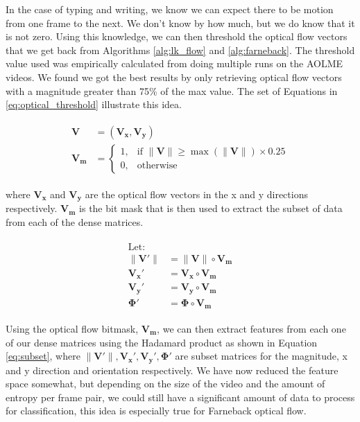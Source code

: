 In the case of typing and writing, we know we can expect there to be motion from
one frame to the next. We don't know by how much, but we do know that it is not
zero. Using this knowledge, we can then threshold the optical flow vectors that
we get back from Algorithms \ref{alg:lk_flow} and \ref{alg:farneback}. The
threshold value used was empirically calculated from doing multiple runs on the
AOLME videos. We found we got the best results by only retrieving
optical flow vectors with a magnitude greater than 75\% of the max value. The set
of Equations in \ref{eq:optical_threshold} illustrate this idea.

\begin{align}
  \label{eq:optical_threshold}
  \begin{split}
  \mathbf{V} &= (\mathbf{V_x}, \mathbf{V_y}) \\
  \mathbf{V_m} &=
  \begin{cases}
    1, & \text{if } \|\mathbf{V}\| \geq \max( \|\mathbf{V}\|) \times 0.25 \\
    0, & \text{otherwise}
  \end{cases}
  \end{split}
\end{align}

where $\mathbf{V_x}$ and $\mathbf{V_y}$ are the optical flow vectors in the
x and y directions respectively. $\mathbf{V_m}$ is the bit mask that is
then used to extract the subset of data from each of the dense matrices.

\begin{align}
  \label{eq:subset}
  \begin{split}
  \text{Let: } \\
  \|\mathbf{V\prime}\| &= \|\mathbf{V}\| \circ \mathbf{V_m}\\
  \mathbf{V_x\prime} &= \mathbf{V_x} \circ \mathbf{V_m}\\
  \mathbf{V_y\prime} &= \mathbf{V_y} \circ \mathbf{V_m}\\
  \mathbf{\Phi\prime} &= \mathbf{\Phi} \circ \mathbf{V_m}
\end{split}
\end{align}

Using the optical flow bitmask, $\mathbf{V_m}$, we can then extract features
from each one of our dense matrices using the Hadamard product as shown in
Equation \ref{eq:subset}, where $\|\mathbf{V\prime}\|,
\mathbf{V_x\prime},\mathbf{V_y\prime}, \mathbf{\Phi\prime}$ are subset matrices
for the magnitude, x and y direction and orientation respectively. We have now
reduced the feature space somewhat, but depending on the size of the video and the
amount of entropy per frame pair, we could still have a significant amount of
data to process for classification, this idea is especially true for
Farneback optical flow.

